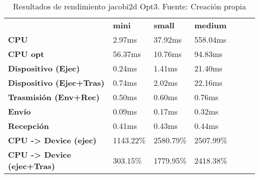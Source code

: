 \begin{table}[H]
    \centering
    \begin{tabular}{lllllll}
    \rowcolor[HTML]{DAE8FC} \ &  \textbf{mini} &  \textbf{	small} &  \textbf{	medium} \\
    \cellcolor[HTML]{DAE8FC} \textbf{CPU} & 2.97ms & 	37.92ms & 	558.04ms \\
    \rowcolor[HTML]{EFEFEF} \cellcolor[HTML]{DAE8FC} \textbf{CPU opt} & 56.37ms & 	10.76ms & 	94.83ms \\
    \cellcolor[HTML]{DAE8FC} \textbf{Dispositivo (Ejec)} & 0.24ms & 	1.41ms & 	21.40ms \\
    \rowcolor[HTML]{EFEFEF} \cellcolor[HTML]{DAE8FC} \textbf{Dispositivo (Ejec+Tras)} & 0.74ms & 	2.02ms & 	22.16ms \\
    \cellcolor[HTML]{DAE8FC} \textbf{Trasmisión (Env+Rec)} & 0.50ms & 	0.60ms & 	0.76ms \\
    \rowcolor[HTML]{EFEFEF} \cellcolor[HTML]{DAE8FC} \textbf{Envío} & 0.09ms & 	0.17ms & 	0.32ms \\
    \cellcolor[HTML]{DAE8FC} \textbf{Recepción} & 0.41ms & 	0.43ms & 	0.44ms \\
    \rowcolor[HTML]{EFEFEF} \cellcolor[HTML]{DAE8FC} \textbf{CPU -> Device (ejec)} & 1143.22\% & 	2580.79\% & 	2507.99\% \\
    \cellcolor[HTML]{DAE8FC} \textbf{CPU -> Device (ejec+Tras)} & 303.15\% & 	1779.95\% & 	2418.38\% \\
    \end{tabular}
    \caption[Resultados de rendimiento jacobi2d Opt3]{{Resultados de rendimiento jacobi2d Opt3. Fuente: Creación propia}}
    \label{table_test_jacobi2d_Opt3_hw_performanceResults}
\end{table}